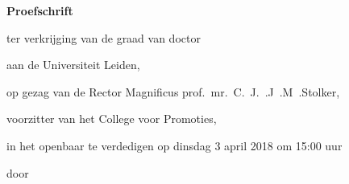  \begin{titlepage}

\begin{center}








\vspace*{2\bigskipamount}

{\makeatletter
\titlestyle\bfseries\LARGE\@title
\makeatother}

{\makeatletter
\ifx\@subtitle\undefined\else
    \bigskip
    \titlefont\titleshape\Large\@subtitle
\fi
\makeatother}

\vfill


{\Large\titlefont\bfseries Proefschrift}

\bigskip
\bigskip

ter verkrijging van de graad van doctor

aan de Universiteit Leiden,

op gezag van de Rector Magnificus prof.~mr.~C.~J.~.J~.M~.Stolker,

voorzitter van het College voor Promoties,

in het openbaar te verdedigen op dinsdag 3 april 2018 om 15:00 uur

\bigskip
\bigskip

door

\bigskip
\bigskip

\makeatletter
{\Large\titlefont\bfseries\@firstname\ {\titleshape\@lastname}}
\makeatother


\end{center}
\end{titlepage}
